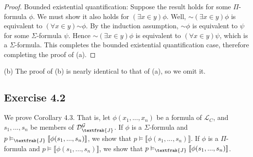 \documentclass{article}
\newcommand*{\oldneg}{\mathord{\sim}}
\newcommand{\lbc}{\llbracket}
\newcommand{\rbc}{\rrbracket}
\theoremstyle{definition}
\begin{document}
\begin{proof}
Bounded existential quantification: Suppose the result holds for some $\Pi$-formula $\phi$. We must show it 
also holds for $(\exists x\in y)\phi$. Well, $\oldneg(\exists x\in y)\phi$ is 
equivalent to $(\forall x\in y)\oldneg\phi$. By the induction assumption, $\oldneg\phi$ is equivalent to
$\psi$ for some $\Sigma$-formula $\psi$. Hence $\oldneg(\exists x\in y)\phi$ is equivalent to
$(\forall x\in y)\psi$, which is a $\Sigma$-formula. This completes the bounded existential quantification case, 
therefore completing the proof of (a).

\end{proof}

(b) The proof of (b) is nearly identical to that of (a), so we omit it.

\subsection*{Exercise 4.2}
We prove Corollary 4.3. That is, let $\phi(x_1,...,x_n)$ be a formula of $\mathcal{L}_C$, and  $s_1,...,s_n$ be members of 
$\mathcal{D}^\mathcal{G}_\textfrak{J}$. If $\phi$ is a $\Sigma$-formula and 
$p\vDash_\textfrak{J}\lbc\phi(s_1,...,s_n)\rbc$, we show that $p\vDash\lbc\phi(s_1,...,s_n)\rbc$. If $\phi$ is a 
$\Pi$-formula and $p\vDash\lbc\phi(s_1,...,s_n)\rbc$, we show that $p\vDash_\textfrak{J}\lbc\phi(s_1,...,s_n)\rbc$.
\end{document}
